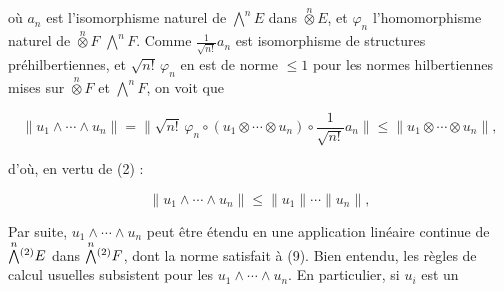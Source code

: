 où $a_n$ est l'isomorphisme  naturel de
$\overset{n}{\bigwedge}E$ dans $\overset{n}{\otimes}E$, et $\varphi_n$ l'homomorphisme naturel de
$\overset{n}{\otimes}F$   $\overset{n}{\bigwedge}F$. Comme $\frac1{\sqrt{n!}}a_n$ est 
isomorphisme de structures préhilbertiennes, et $\sqrt{n!}\,\varphi_n$ en est
de norme $\leq1$ pour les normes hilbertiennes mises
sur $\overset{n}{\otimes}F$ et $\overset{n}{\bigwedge}F$, on voit que

\[
\|u_1\wedge\cdots\wedge u_n\|=\|\sqrt{n!}\,\varphi_n\circ(u_1\otimes\cdots\otimes u_n)\circ\frac1{\sqrt{n!}}a_n\|\leq\|u_1\otimes\cdots\otimes u_n\|,
\]

d'où, en vertu de (2) :

\[
\|u_1\wedge\cdots\wedge u_n\|\leq\|u_1\|\cdots\|u_n\|, \tag*{(9)}
\]

Par suite, $u_1\wedge\cdots\wedge u_n$ peut être étendu en
une application linéaire continue de $\overset{n}{\bigwedge}\vphantom{\bigwedge}^{(2)}E$ dans
$\overset{n}{\bigwedge}\vphantom{\bigwedge}^{(2)}F$,  dont la norme satisfait à (9). Bien entendu,
les règles de calcul usuelles subsistent pour les
 $u_1\wedge\cdots\wedge u_n$.  En particulier, si $u_i$ est un

